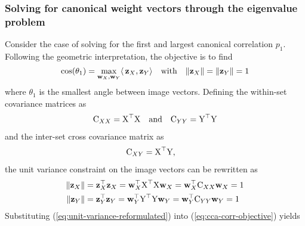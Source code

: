 \subsubsection{Solving for canonical weight vectors through the eigenvalue problem}
Consider the case of solving for the first and largest canonical correlation $p_1$. Following the geometric interpretation, the objective is to find
\begin{equation}
    \cos(\theta_1) = \max_{{\mathbf{w}}_X, {\mathbf{w}}_Y}\langle\,{\mathbf{z}}_X,{\mathbf{z}}_Y\rangle \quad \textrm{with} \quad \|{\mathbf{z}}_X\| = \|{\mathbf{z}}_Y\| = 1
\label{eq:cca-objective-1}
\end{equation}
where $\theta_1$ is the smallest angle between image vectors. Defining the within-set covariance matrices as 
\begin{align}
    {\textrm{C}}_{XX} = {\textrm{X}}^\top{\textrm{X}} \quad \textrm{and} \quad
    {\textrm{C}}_{YY} = {\textrm{Y}}^\top {\textrm{Y}} 
\end{align}
and the inter-set cross covariance matrix as 
\begin{align}
    {\textrm{C}}_{XY} &= {\textrm{X}}^\top{\textrm{Y}},
\end{align}
the unit variance constraint on the image vectors can be rewritten as  \begin{align}
\begin{split}
    \|{\mathbf{z}}_X\| &= {\mathbf{z}}_X^\top{\mathbf{z}}_X = {\mathbf{w}}_X^\top {\textrm{X}}^\top {\textrm{X}} {\mathbf{w}}_X =  {\mathbf{w}}_X^\top {\textrm{C}}_{XX} {\mathbf{w}}_X = 1 \\
    \|{\mathbf{z}}_Y\| &= {\mathbf{z}}_Y^\top{\mathbf{z}}_Y = {\mathbf{w}}_Y^\top {\textrm{Y}}^\top {\textrm{Y}} {\mathbf{w}}_Y =  {\mathbf{w}}_Y^\top {\textrm{C}}_{YY} {\mathbf{w}}_Y = 1 
    \end{split}
\label{eq:unit-variance-reformulated}
\end{align}
Substituting (\ref{eq:unit-variance-reformulated}) into (\ref{eq:cca-corr-objective}) yields 

